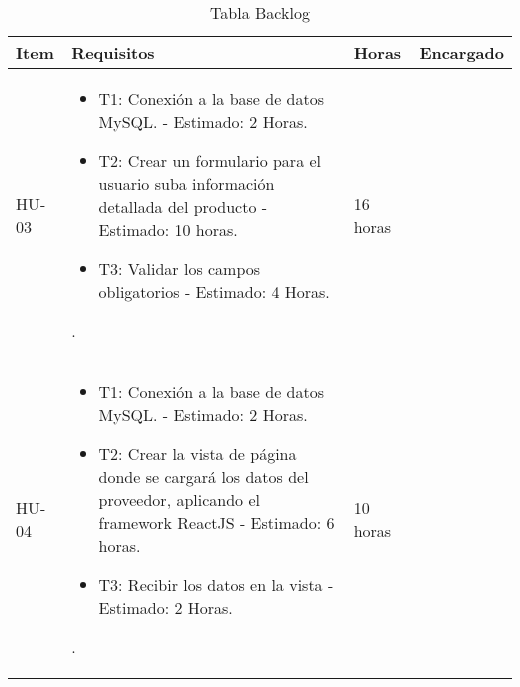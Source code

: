 \begin{table}[htbp]
	\begin{center}
		\begin{tabular}{|p{2.5cm}|p{6.5cm}|p{2.5cm}|p{2.5cm}|}
			\hline
			Item & Requisitos & Horas & Encargado\\
			\hline \hline
			HU-03 & \begin{itemize}
				\item T1: Conexión a la base de datos MySQL. - Estimado: 2 Horas.
				
				\item T2: Crear un formulario para el usuario suba información detallada
				del producto  - Estimado: 10 horas.
				
				
				\item T3: Validar los campos obligatorios  - Estimado: 4 Horas.
				
				
				
			\end{itemize}. & 16 horas & \\ \hline
			HU-04 &  \begin{itemize}
				\item T1: Conexión a la base de datos MySQL. - Estimado: 2 Horas.
				
				\item T2: Crear la vista de página donde se cargará los datos del proveedor, aplicando el framework ReactJS  - Estimado: 6 horas.
				
				\item T3: Recibir los datos en la vista - Estimado: 2 Horas.
				
				
			\end{itemize}. & 10 horas & \\ \hline
			
			
			
		\end{tabular}
		\caption{Tabla Backlog}
		\label{tabla:sencilla}
	\end{center}
\end{table}